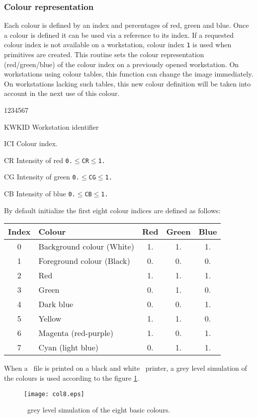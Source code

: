 \subsubsection{Colour representation}
Each colour is defined by an index and percentages of red, green and blue.
Once a colour is defined it can be used via a reference to its index. If a
requested colour index is not available on a workstation, colour index {\tt 1}
is used when primitives are created.
\Action
This routine sets the colour representation (red/green/blue) of the colour index
on a previously opened workstation. On workstations using colour tables, this
function can change the image immediately. On workstations lacking such tables,
this new colour definition will be taken into account in the next use of this
colour.
\Pdesc
\begin{DLtt}{1234567}
\item[KWKID] Workstation identifier
\item[ICI]   Colour index.
\item[CR]    Intensity of red {\tt0.$\leq$CR$\leq$1.}
\item[CG]    Intensity of green {\tt0.$\leq$CG$\leq$1.}
\item[CB]    Intensity of blue {\tt0.$\leq$CB$\leq$1.}
\end{DLtt}
By default  initialize the first eight colour indices are defined as follows:
\begin{center}
\begin{tabular}{||c|l|c|c|c||}
\hline
Index & Colour & Red & Green & Blue \\
\hline
0 & Background colour (White) & 1. & 1. & 1. \\
1 & Foreground colour (Black) & 0. & 0. & 0. \\
2 & Red                       & 1. & 1. & 1. \\
3 & Green                     & 0. & 1. & 0. \\
4 & Dark blue                 & 0. & 0. & 1. \\
5 & Yellow                    & 1. & 1. & 0. \\
6 & Magenta (red-purple)      & 1. & 0. & 1. \\
7 & Cyan (light blue)         & 0. & 1. & 1. \\
\hline
\end{tabular}
\end{center}
%
When a \PS~file is printed on a black and white \PS~printer, a grey level
simulation of the colours is used according to the
figure \ref{COLPS}.
\begin{figure}[t]
\texttt{[image: col8.eps]}
\caption{\PS~grey level simulation of the eight basic colours.}
\label{COLPS}
\end{figure}
%
